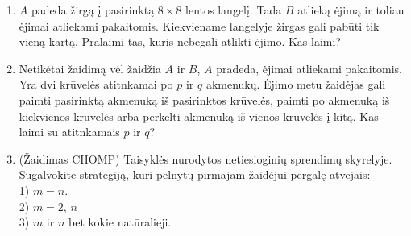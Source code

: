\begin{enumerate}
%
%

\item $A$ padeda žirgą  į pasirinktą  $8\times 8$ lentos langelį. Tada $B$
  atlieką ėjimą ir toliau ėjimai atliekami pakaitomis. Kiekviename
  langelyje žirgas gali pabūti tik vieną kartą. Pralaimi tas, kuris
  nebegali atlikti ėjimo. Kas laimi?


\item Netikėtai žaidimą vėl žaidžia $A$ ir $B$, $A$ pradeda, ėjimai atliekami pakaitomis. Yra dvi krūvelės atitnkamai po $p$ ir $q$ akmenukų. Ėjimo metu žaidėjas gali paimti pasirinktą akmenuką iš pasirinktos krūvelės, paimti po akmenuką iš kiekvienos krūvelės arba perkelti akmenuką iš vienos krūvelės į kitą. Kas laimi su atitnkamais $p$ ir $q$?


\item(Žaidimas CHOMP)
  Taisyklės nurodytos netiesioginių sprendimų skyrelyje. Sugalvokite
  strategiją, kuri pelnytų pirmajam žaidėjui pergalę atvejais: \\
  1) $m=n$. \\
  2) $m=2$, $n$ \\
  3) $m$ ir $n$ bet kokie natūralieji.


\end{enumerate}
